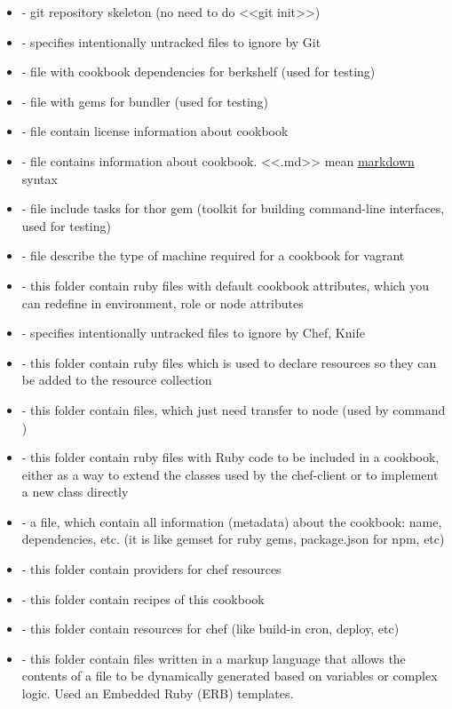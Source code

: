 \begin{itemize}
  \item {} - git repository skeleton (no need to do <<git init>>)
  \item {} - specifies intentionally untracked files to ignore by Git
  \item {} - file with cookbook dependencies for berkshelf (used for testing)
  \item {} - file with gems for bundler (used for testing)
  \item {} - file contain license information about cookbook
  \item {} - file contains information about cookbook. <<.md>> mean \href{http://daringfireball.net/projects/markdown/syntax}{markdown} syntax
  \item {} - file include tasks for thor gem (toolkit for building command-line interfaces, used for testing)
  \item {} - file describe the type of machine required for a cookbook for vagrant
  \item {} - this folder contain ruby files with default cookbook attributes, which you can redefine in environment, role or node attributes
  \item {} - specifies intentionally untracked files to ignore by Chef, Knife
  \item {} - this folder contain ruby files which is used to declare resources so they can be added to the resource collection
  \item {} - this folder contain files, which just need transfer to node (used by command )
  \item {} - this folder contain ruby files with Ruby code to be included in a cookbook, either as a way to extend the classes used by the chef-client or to implement a new class directly
  \item {} - a file, which contain all information (metadata) about the cookbook: name, dependencies, etc. (it is like gemset for ruby gems, package.json for npm, etc)
  \item {} - this folder contain providers for chef resources
  \item {} - this folder contain recipes of this cookbook
  \item {} - this folder contain resources for chef (like build-in cron, deploy, etc)
  \item {} - this folder contain files written in a markup language that allows the contents of a file to be dynamically generated based on variables or complex logic. Used an Embedded Ruby (ERB) templates.
\end{itemize}
